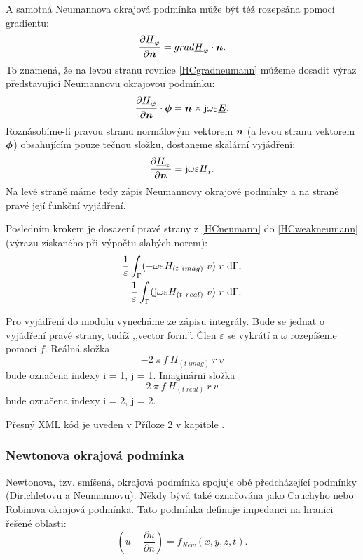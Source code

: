 \documentclass[12pt,a4paper,oneside]{article}
\numberwithin{equation}{section} %
\numberwithin{figure}{section} %
\numberwithin{table}{section} %
\newcommand{\mj}{\mathrm{j}} %
\renewcommand{\vec}[1]{\mbox{\boldmath$#1$}} %
\newcommand{\faz}[1]{{\underline{#1}}} %
\begin{document}
A samotná Neumannova okrajová podmínka může být též rozepsána pomocí gradientu:
\begin{equation}
\label{HCgradneumann}
\frac{\partial \faz{H} _{\varphi}}{\partial \vec{n}} = grad \faz{H} _{\varphi} \cdot \vec{n} .
\end{equation}
To znamená, že na levou stranu rovnice \ref{HCgradneumann} můžeme dosadit výraz představující Neumannovu okrajovou podmínku:
\begin{equation}
\label{NeumannHCvek}
\frac{\partial \faz{H}_{\varphi}}{\partial \vec{n}} \cdot \vec{\phi} = \vec{n} \times \mj \omega \varepsilon \faz{\vec{E}} .
\end{equation}
Roznásobíme-li pravou stranu normálovým vektorem $\vec{n}$ (a levou stranu vektorem $\vec{\phi}$) obsahujícím pouze tečnou složku, dostaneme skalární vyjádření:
\begin{equation}
\label{HCneumann}
\frac{\partial \faz{H} _{\varphi}}{\partial \vec{n}} = \mj \omega \varepsilon \faz{H} _t .
\end{equation}
Na levé straně máme tedy zápis Neumannovy okrajové podmínky a na straně pravé její funkční vyjádření.

Posledním krokem je dosazení pravé strany z \ref{HCneumann} do \ref{HCweakneumann} (výrazu získaného při výpočtu slabých norem):
\begin{subequations}
\begin{align}
\frac{1}{\varepsilon} \int _{\Gamma} (- \omega \varepsilon H_{(t~imag)} ~ v ) ~ r ~ \ud \Gamma ,
\\ 
\frac{1}{\varepsilon} \int _{\Gamma} ( \mj \omega \varepsilon H_{(t~real)} ~ v ) ~ r ~ \ud \Gamma .
\end{align}
\end{subequations}

Pro vyjádření do modulu vynecháme ze zápisu integrály. Bude se jednat o vyjádření pravé strany, tudíž ,,vector form''. Člen $\varepsilon$ se vykrátí a $\omega$ rozepíšeme pomocí $f$. Reálná složka 
\begin{equation}
- 2 ~ \pi ~ f ~ H_{(t~imag)} ~ r ~ v
\end{equation} 
bude označena indexy i = 1, j = 1. Imaginární složka 
\begin{equation}
2 ~ \pi ~ f ~ H_{(t~real)} ~ r ~ v
\end{equation}
bude označena indexy i = 2, j = 2.

Přesný XML kód je uveden v Příloze 2 v kapitole .


\subsubsection{Newtonova okrajová podmínka}
Newtonova, tzv. smíšená, okrajová podmínka spojuje obě předcházející podmínky (Dirichletovu a Neumannovu). Někdy bývá také označována jako Cauchyho nebo Robinova okrajová podmínka. Tato podmínka definuje impedanci na hranici řešené oblasti:
\begin{equation}
\label{Newton}
\left( u + \frac{\partial u}{\partial n} \right) = f _{New} (x, y, z, t) .
\end{equation}  
\end{document}

